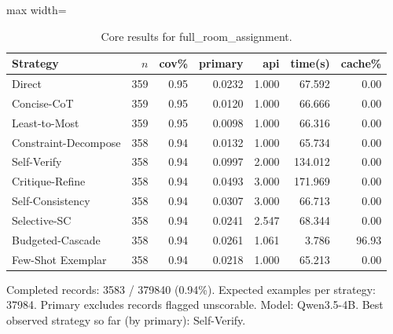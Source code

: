 \documentclass[10pt,twocolumn]{article}
\begin{document}
\begin{table}[t]
\centering
\caption{Core results for full\_room\_assignment.}
\label{tab:full_room_assignment_core}
\begin{adjustbox}{max width=\textwidth}
\begin{tabular}{lrrrrrr}
\toprule
Strategy & $n$ & cov\% & primary & api & time(s) & cache\% \\
\midrule
Direct & 359 & 0.95 & 0.0232 & 1.000 & 67.592 & 0.00 \\
Concise-CoT & 359 & 0.95 & 0.0120 & 1.000 & 66.666 & 0.00 \\
Least-to-Most & 359 & 0.95 & 0.0098 & 1.000 & 66.316 & 0.00 \\
Constraint-Decompose & 358 & 0.94 & 0.0132 & 1.000 & 65.734 & 0.00 \\
Self-Verify & 358 & 0.94 & 0.0997 & 2.000 & 134.012 & 0.00 \\
Critique-Refine & 358 & 0.94 & 0.0493 & 3.000 & 171.969 & 0.00 \\
Self-Consistency & 358 & 0.94 & 0.0307 & 3.000 & 66.713 & 0.00 \\
Selective-SC & 358 & 0.94 & 0.0241 & 2.547 & 68.344 & 0.00 \\
Budgeted-Cascade & 358 & 0.94 & 0.0261 & 1.061 & 3.786 & 96.93 \\
Few-Shot Exemplar & 358 & 0.94 & 0.0218 & 1.000 & 65.213 & 0.00 \\
\bottomrule
\end{tabular}
\end{adjustbox}
\vspace{2pt}\parbox{0.98\textwidth}{\footnotesize Completed records: 3583 / 379840 (0.94\%). Expected examples per strategy: 37984. Primary excludes records flagged unscorable. Model: Qwen3.5-4B. Best observed strategy so far (by primary): Self-Verify.}
\end{table}
\end{document}

